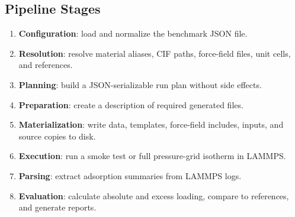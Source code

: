 \subsection{Pipeline Stages}

\begin{enumerate}
    \item \textbf{Configuration}: load and normalize the benchmark JSON file.
    \item \textbf{Resolution}: resolve material aliases, CIF paths, force-field files, unit cells, and references.
    \item \textbf{Planning}: build a JSON-serializable run plan without side effects.
    \item \textbf{Preparation}: create a description of required generated files.
    \item \textbf{Materialization}: write data, templates, force-field includes, inputs, and source copies to disk.
    \item \textbf{Execution}: run a smoke test or full pressure-grid isotherm in LAMMPS.
    \item \textbf{Parsing}: extract adsorption summaries from LAMMPS logs.
    \item \textbf{Evaluation}: calculate absolute and excess loading, compare to references, and generate reports.
\end{enumerate}
